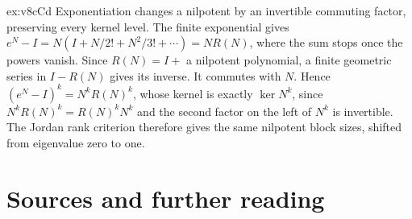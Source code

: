 \begin{solution}{ex:v8cCd}
\idea Exponentiation changes a nilpotent by an invertible commuting factor, preserving every kernel level.
\writeup The finite exponential gives $e^N-I=N(I+N/2!+N^2/3!+\cdots)=NR(N)$, where the sum stops once the powers vanish. Since $R(N)=I+$ a nilpotent polynomial, a finite geometric series in $I-R(N)$ gives its inverse. It commutes with $N$. Hence $(e^N-I)^k=N^kR(N)^k$, whose kernel is exactly $\ker N^k$, since $N^kR(N)^k=R(N)^kN^k$ and the second factor on the left of $N^k$ is invertible. The Jordan rank criterion therefore gives the same nilpotent block sizes, shifted from eigenvalue zero to one.
\end{solution}

\section*{Sources and further reading}

